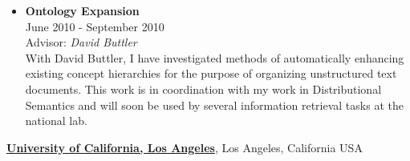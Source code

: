 \documentclass[10pt]{article}
\newenvironment{outerlist}[1][\enskip\textbullet]%
        {\begin{itemize}[#1,leftmargin=*]}{\end{itemize}%
         \vspace{-.6\baselineskip}}
\begin{document}
\begin{outerlist}
\item[] \textbf{Ontology Expansion} \\
        June 2010 - September 2010 \\
        Advisor: \textit{David Buttler} \\

        With David Buttler, I have investigated methods of automatically
        enhancing existing concept hierarchies for the purpose of organizing
        unstructured text documents. This work is in coordination with my work
        in Distributional Semantics and will soon be used by several information
        retrieval tasks at the national lab. \\

\end{outerlist}

\href{http://www.cs.ucla.edu/}{\textbf{University of California, Los Angeles}},
Los Angeles, California USA
\end{document}
